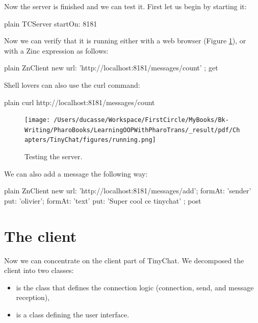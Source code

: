 \documentclass[10pt,twoside,english]{_support/latex/sbabook/sbabook}
\begin{document}
Now the server is finished and we can test it. 
First let us begin by starting it:  

\begin{displaycode}{plain}
	TCServer startOn: 8181
\end{displaycode}

Now we can verify that it is running either with a web browser (Figure \ref{running}), or with a Zinc expression as follows: 

\begin{displaycode}{plain}
ZnClient new url: 'http://localhost:8181/messages/count' ; get
\end{displaycode}

Shell lovers can also use the curl command:

\begin{displaycode}{plain}
	curl http://localhost:8181/messages/count
\end{displaycode}


\begin{figure}

\begin{center}
\texttt{[image: /Users/ducasse/Workspace/FirstCircle/MyBooks/Bk-Writing/PharoBooks/LearningOOPWithPharoTrans/\_result/pdf/Chapters/TinyChat/figures/running.png]}\caption{Testing the server.\label{running}}\end{center}
\end{figure}


We can also add a message the following way:

\begin{displaycode}{plain}
ZnClient new 
	url: 'http://localhost:8181/messages/add';
	formAt: 'sender' put: 'olivier';
	formAt: 'text' put: 'Super cool ce tinychat' ; post
\end{displaycode}
\section{The client }
Now we can concentrate on the client part of TinyChat. We decomposed the client into two classes:

\begin{itemize}
\item {} is the class that defines the connection logic (connection, send, and message reception),
\item {} is a class defining the user interface. 
\end{itemize}
\end{document}
